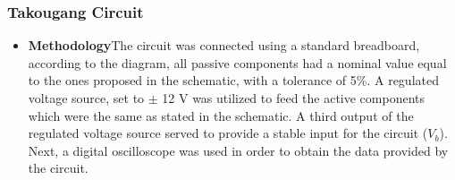 \subsubsection{Takougang Circuit}
 \begin{itemize}
  \item \textbf{Methodology}The circuit was connected using a standard breadboard, according to the diagram, all passive components had a nominal value equal to the ones proposed in the schematic, with a tolerance of 5\%. A regulated voltage source, set to $\pm$ 12 V was utilized to feed the active components which were the same as stated in the schematic. A third output of the regulated voltage source served to provide a stable input for the circuit ($V_b$). Next, a digital oscilloscope was used in order to obtain the data provided by the circuit.


\end{itemize}
